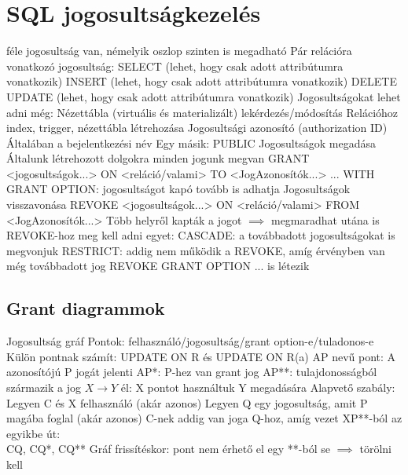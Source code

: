 \documentclass[12pt,a4paper]{article}
\begin{document}
\pagebreak

\section{SQL jogosultságkezelés}

\begin{outline}
	 féle jogosultság van, némelyik oszlop szinten is megadható
	\1 Pár relációra vonatkozó jogosultság:
		\2 SELECT (lehet, hogy csak adott attribútumra vonatkozik)
		\2 INSERT (lehet, hogy csak adott attribútumra vonatkozik)
		\2 DELETE
		\2 UPDATE (lehet, hogy csak adott attribútumra vonatkozik)
	\1 Jogosultságokat lehet adni még:
		\2 Nézettábla (virtuális és materializált) lekérdezés/módosítás
		\2 Relációhoz index, trigger, nézettábla létrehozása
	\1 Jogosultsági azonosító (authorization ID)
		\2 Általában a bejelentkezési név
		\2 Egy másik: PUBLIC
	\1 Jogosultságok megadása
		\2 Általunk létrehozott dolgokra minden jogunk megvan
		\2 GRANT <jogosultságok...> ON <reláció/valami> TO <JogAzonosítók...>
		\2 ... WITH GRANT OPTION: jogosultságot kapó tovább is adhatja
	\1 Jogosultságok visszavonása
		\2 REVOKE <jogosultságok...> ON <reláció/valami> FROM <JogAzonosítók...>
		\2 Több helyről kapták a jogot $\implies$ megmaradhat utána is
		\2 REVOKE-hoz meg kell adni egyet:
			\3 CASCADE: a továbbadott jogosultságokat is megvonjuk
			\3 RESTRICT: addig nem működik a REVOKE, amíg érvényben van még továbbadott jog
		\2 REVOKE GRANT OPTION ... is létezik
\end{outline}

\pagebreak

\subsection{Grant diagrammok}

\begin{outline}
	\1 Jogosultság gráf
	\1 Pontok: felhasználó/jogosultság/grant option-e/tuladonos-e
		\2 Külön pontnak számít: UPDATE ON R és UPDATE ON R(a)
		\2 AP nevű pont: A azonosítójú P jogát jelenti
		\2 AP*: P-hez van grant jog
		\2 AP**: tulajdonosságból származik a jog
	\1 $X \to Y$ él: X pontot használtuk Y megadására
	\1 Alapvető szabály:
		\2 Legyen C és X felhasználó (akár azonos)
		\2 Legyen Q egy jogosultság, amit P magába foglal (akár azonos)
		\2 C-nek addig van joga Q-hoz, amíg vezet XP**-ból az egyikbe út:\\
		CQ, CQ*, CQ**
	\1 Gráf frissítéskor: pont nem érhető el egy **-ból se $\implies$ törölni kell
\end{outline}
\end{document}
